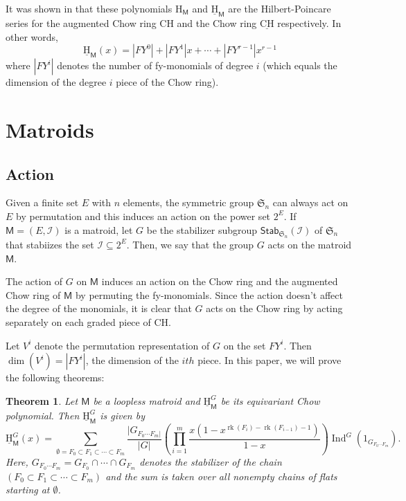 \documentclass[10pt, a4paper, english]{amsart}
\theoremstyle{teoremas}
\newtheorem{theorem}{Theorem}[section]
\theoremstyle{definition}
\DeclareMathOperator{\rk}{rk}
\newcommand{\M}{\mathsf{M}}
\newcommand{\stab}{\mathsf{Stab}}
\newcommand{\cI}{\mathcal{I}}
\newcommand{\symm}{\mathfrak{S}}
\renewcommand{\H}{\mathrm{H}}
\newcommand{\CH}{\mathrm{CH}}
\newcommand{\uH}{\underline{\mathrm{H}}}
\newcommand{\uCH}{\underline{\mathrm{CH}}}
\newcommand{\Ind}{\operatorname{Ind}}
\begin{document}
It was shown in \cite{fmsv24} that these polynomials $\H_\M$ and $\uH_\M$ are the Hilbert-Poincare series
for the augmented Chow ring $\CH$ and the Chow ring $\uCH$ respectively. In other words,
$$\uH_\M(x) = |FY^0| + |FY^1|x +\cdots + |FY^{r-1}|x^{r-1}$$
where $|FY^i|$ denotes the number of fy-monomials of degree $i$ (which equals the dimension of the degree $i$ piece of the Chow ring).

\section{Matroids}\label{sec:matroids}
\subsection{Action}
Given a finite set $E$ with $n$ elements, the symmetric group $\symm_n$ can always act on $E$ by permutation and this induces an
action on the power set $2^E$. If $\M = (E, \cI)$ is a matroid, let $G$ be the stabilizer subgroup $\stab_{\symm_n}(\cI)$ of $\symm_n$ that
stabiizes the set $\cI\subseteq 2^E$. Then, we say that the group $G$ acts on the matroid $\M$.

The action of $G$ on $\M$ induces an action on the Chow ring and the augmented Chow ring of $\M$ by permuting the fy-monomials. Since the action doesn't
affect the degree of the monomials, it is clear that $G$ acts on the Chow ring by acting separately on each graded piece of $\CH$.

Let $V^i$ denote the permutation representation of $G$ on the set $FY^i$. Then $\dim(V^i) = |FY^i|$, the dimension of the $ith$ piece. In this paper,
we will prove the following theorems:

\begin{theorem}\label{thm:main-recursion-defi-H-and-uH}
    Let $\M$ be a loopless matroid and $\uH_{\M}^G$ be its equivariant Chow polynomial. Then $\uH_{\M}^G$ is given by
    \begin{equation}
        \uH_{\M}^G(x) = \sum_{\emptyset = F_0\subset F_1\subset\cdots\subset F_m}{\frac{|G_{F_0\cdots F_m|}}{|G|}
        \left(\prod_{i=1}^{m}{\frac{x(1-x^{\rk(F_i)-\rk(F_{i-1})-1})}{1-x}}\right)
        \Ind^G(1_{G_{F_0\cdots F_m}})}.
    \end{equation}
    Here, $G_{F_0\cdots F_m} = G_{F_0}\cap\cdots\cap G_{F_m}$ denotes the stabilizer of the chain $(F_0\subset F_1\subset\cdots\subset F_m)$
    and the sum is taken over all nonempty chains of flats starting at $\emptyset$.
\end{theorem}
\end{document}
